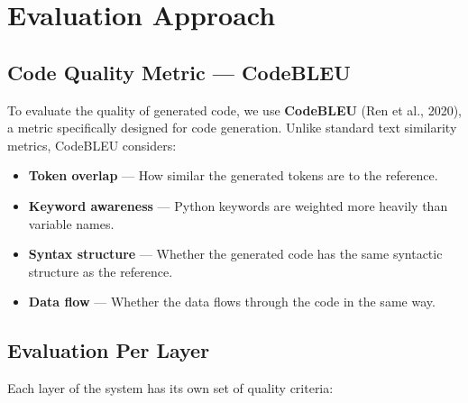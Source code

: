 \documentclass[11pt,a4paper]{article}
\begin{document}
\section{Evaluation Approach}

\subsection{Code Quality Metric — CodeBLEU}

To evaluate the quality of generated code, we use \textbf{CodeBLEU} (Ren et al., 2020), a metric specifically designed for code generation. Unlike standard text similarity metrics, CodeBLEU considers:

\begin{itemize}[leftmargin=1.5em]
    \item \textbf{Token overlap} — How similar the generated tokens are to the reference.
    \item \textbf{Keyword awareness} — Python keywords are weighted more heavily than variable names.
    \item \textbf{Syntax structure} — Whether the generated code has the same syntactic structure as the reference.
    \item \textbf{Data flow} — Whether the data flows through the code in the same way.
\end{itemize}

\subsection{Evaluation Per Layer}

Each layer of the system has its own set of quality criteria:
\end{document}
